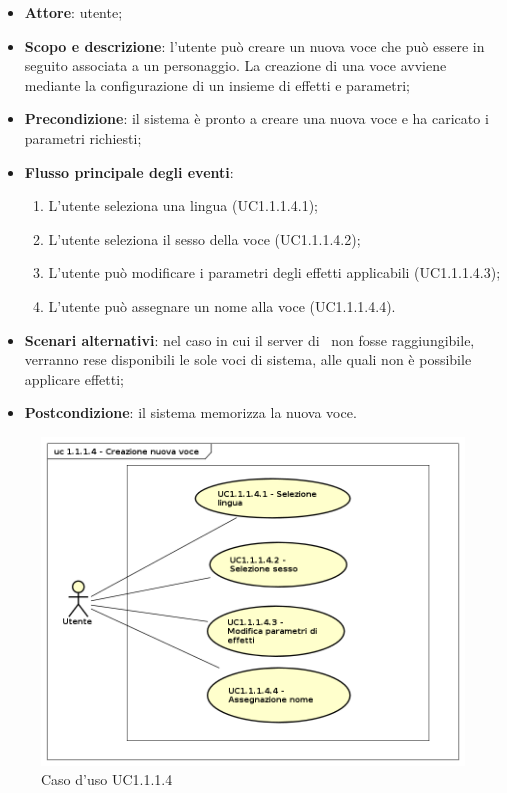 \begin{itemize}
\item \textbf{Attore}: utente;
\item \textbf{Scopo e descrizione}: l'utente può creare un nuova voce che può essere in seguito associata a un personaggio. La creazione di una voce avviene mediante la configurazione di un insieme di effetti e parametri;
\item \textbf{Precondizione}: il sistema è pronto a creare una nuova voce e ha caricato i parametri richiesti;
\item \textbf{Flusso principale degli eventi}:
\begin{enumerate}
\item L'utente seleziona una lingua (UC1.1.1.4.1);
\item L'utente seleziona il sesso della voce (UC1.1.1.4.2);
\item L'utente può modificare i parametri degli effetti applicabili (UC1.1.1.4.3);
\item L'utente può assegnare un nome alla voce (UC1.1.1.4.4).
\end{enumerate} 
\item \textbf{Scenari alternativi}: nel caso in cui il server di \AZIENDA\ non fosse raggiungibile, verranno rese disponibili le sole voci di sistema, alle quali non è possibile applicare effetti;
\item \textbf{Postcondizione}: il sistema memorizza la nuova voce.
\end{itemize}
\begin{figure}[htbp]
\centering
\includegraphics[scale=0.5]{immagini/uc1_1_1_4_creazione_nuova_voce.png}
\captionsetup{labelfont=bf}
\caption{Caso d'uso UC1.1.1.4}
\end{figure}
\newpage


